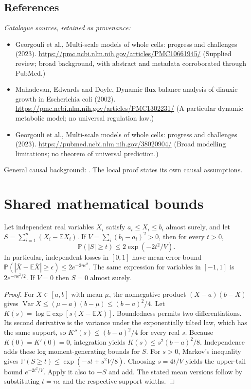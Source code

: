 \documentclass[11pt]{article}
\begin{document}
\subsection{References}
\noindent\emph{Catalogue sources, retained as provenance:}
\begin{itemize}
\item Georgouli et al., Multi-scale models of whole cells: progress and challenges (2023). \url{https://pmc.ncbi.nlm.nih.gov/articles/PMC10661945/} (Supplied review; broad background, with abstract and metadata corroborated through PubMed.)
\item Mahadevan, Edwards and Doyle, Dynamic flux balance analysis of diauxic growth in Escherichia coli (2002). \url{https://pmc.ncbi.nlm.nih.gov/articles/PMC1302231/} (A particular dynamic metabolic model; no universal regulation law.)
\item Georgouli et al., Multi-scale models of whole cells: progress and challenges (2023). \url{https://pubmed.ncbi.nlm.nih.gov/38020904/} (Broad modelling limitations; no theorem of universal prediction.)
\end{itemize}
\noindent General causal background: \cite{pearl}. The local proof states its own causal assumptions.




\section{Shared mathematical bounds}\label{app:bounds}
\begin{lemma}\label{lem:bounded}
Let independent real variables $X_i$ satisfy $a_i\leq X_i\leq b_i$ almost surely,
and let $S=\sum_{i=1}^n(X_i-\mathbb{E} X_i)$. If
$V=\sum_i(b_i-a_i)^2>0$, then for every $t>0$,
\[
 \mathbb{P}(|S|\geq t)\leq 2\exp(-2t^2/V).
\]
In particular, independent losses in $[0,1]$ have mean-error bound
$\mathbb{P}(|\overline X-\mathbb{E}\overline X|\geq\epsilon)
\leq2e^{-2n\epsilon^2}$. The same expression for variables in $[-1,1]$
is $2e^{-n\epsilon^2/2}$. If $V=0$ then $S=0$ almost surely.
\end{lemma}
\begin{proof}
For $X\in[a,b]$ with mean $\mu$, the nonnegative product
$(X-a)(b-X)$ gives
$\operatorname{Var} X\leq(\mu-a)(b-\mu)\leq(b-a)^2/4$.
Let $K(s)=\log\mathbb{E}\exp[s(X-\mathbb{E} X)]$.
Boundedness permits two differentiations. Its second derivative is the variance
under the exponentially tilted law, which has the same support, so
$K''(s)\leq(b-a)^2/4$ for every real $s$.
Because $K(0)=K'(0)=0$, integration yields
$K(s)\leq s^2(b-a)^2/8$.
Independence adds these log moment-generating bounds for $S$.
For $s>0$, Markov's inequality gives
$\mathbb{P}(S\geq t)\leq\exp(-st+s^2V/8)$.
Choosing $s=4t/V$ yields the upper-tail bound $e^{-2t^2/V}$.
Apply it also to $-S$ and add. The stated mean versions follow by substituting
$t=n\epsilon$ and the respective support widths.
\end{proof}
\end{document}
